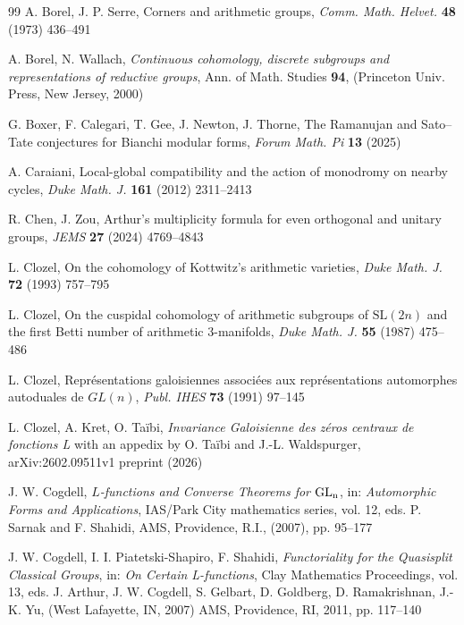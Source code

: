 \documentclass[a4paper,10pt]{amsart}
\theoremstyle{definition}
\numberwithin{equation}{section}
\begin{document}
\begin{thebibliography}{99}
 A. Borel, J. P. Serre, Corners and arithmetic groups, {\it Comm. Math. Helvet.} \textbf{48} (1973) 436--491

 A. Borel, N. Wallach, {\it Continuous cohomology, discrete subgroups and representations of reductive groups}, Ann. of Math. Studies {\bf 94}, (Princeton Univ. Press, New Jersey, 2000)

 G. Boxer, F. Calegari, T. Gee, J. Newton, J. Thorne, The Ramanujan and Sato--Tate conjectures for Bianchi modular forms, {\it Forum Math. Pi} \textbf{13} (2025)

 A. Caraiani, Local-global compatibility and the action of monodromy on nearby cycles, {\it Duke Math. J.} {\bf 161} (2012) 2311--2413

 R. Chen, J. Zou, Arthur's multiplicity formula for even orthogonal and unitary groups, {\it JEMS} {\bf 27} (2024) 4769--4843

 L. Clozel, On the cohomology of Kottwitz's arithmetic varieties, {\it Duke Math. J.} {\bf 72} (1993) 757--795

 L. Clozel, On the cuspidal cohomology of arithmetic subgroups of \(\text{SL}(2n)\) and the first Betti number of arithmetic $3$-manifolds, {\it Duke Math. J.} {\bf 55} (1987) 475--486 

 L. Clozel, Repr\'esentations galoisiennes associ\'ees aux repr\'esentations automorphes autoduales de $GL(n)$, {\it Publ. IHES} {\bf 73} (1991) 97--145

 L. Clozel, A. Kret, O. Ta\"ibi, {\it Invariance Galoisienne des z\'eros centraux de fonctions L} with an appedix by O. Ta\"ibi and J.-L. Waldspurger,  arXiv:2602.09511v1 preprint (2026)

 J. W. Cogdell, {\it $L$-functions and Converse Theorems for ${\rm GL_n}$}, in: {\it Automorphic Forms and Applications}, IAS/Park City mathematics series, vol. 12, eds. P. Sarnak and F. Shahidi, AMS, Providence, R.I., (2007), pp. 95--177

 J. W. Cogdell, I. I. Piatetski-Shapiro, F. Shahidi, {\it Functoriality for the Quasisplit Classical Groups}, in: {\it On Certain L-functions}, Clay Mathematics Proceedings, vol. 13, eds. J. Arthur, J. W. Cogdell, S. Gelbart, D. Goldberg, D. Ramakrishnan, J.-K. Yu, (West Lafayette, IN, 2007) AMS, Providence, RI, 2011, pp. 117--140



\end{thebibliography}
\end{document}
